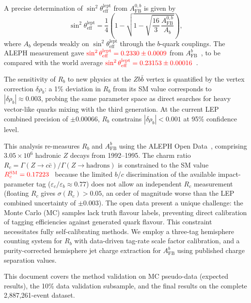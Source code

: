 \documentclass[11pt,a4paper]{article}
\newcommand{\external}[1]{\textcolor{red}{#1}}
\begin{document}
A precise determination of $\sin^2\theta_\text{eff}^\text{lept}$ from
$A_\text{FB}^{0,b}$ is given by
\begin{equation}
\sin^2\theta_\text{eff}^\text{lept} = \frac{1}{4}\left(1 -
\sqrt{1 - \sqrt{\frac{16}{3}\,\frac{A_\text{FB}^{0,b}}{A_b}}}\right),
\label{eq:sin2theta}
\end{equation}
where $A_b$ depends weakly on $\sin^2\theta_\text{eff}^\text{lept}$
through the $b$-quark couplings.
The ALEPH measurement gave
$\external{\sin^2\theta_\text{eff}^\text{lept} = 0.2330 \pm 0.0009}$
from $A_\text{FB}^b$~\cite{ALEPH:AFBb}, to be compared with the
world average
$\external{\sin^2\theta_\text{eff}^\text{lept} = 0.23153 \pm 0.00016}$~\cite{LEP:EWWG:2005}.

The sensitivity of $R_b$ to new physics at the $Zb\bar{b}$ vertex
is quantified by the vertex correction $\delta\rho_b$: a 1\%
deviation in $R_b$ from its SM value corresponds to
$|\delta\rho_b| \approx 0.003$, probing the same parameter space
as direct searches for heavy vector-like quarks mixing with the
third generation.
At the current LEP combined precision of $\pm 0.00066$, $R_b$
constrains $|\delta\rho_b| < 0.001$ at 95\% confidence level.

This analysis re-measures $R_b$ and $A_\text{FB}^b$ using the ALEPH
Open Data~\cite{ALEPH:opendata}, comprising $3.05 \times 10^6$ hadronic
$Z$ decays from 1992--1995.
The charm ratio $R_c = \Gamma(Z \to c\bar{c})/\Gamma(Z \to
\text{hadrons})$ is constrained to the SM value
$\external{R_c^\text{SM} = 0.17223}$~\cite{LEP:EWWG:2005}
because the limited $b$/$c$ discrimination of the available
impact-parameter tag ($\varepsilon_c/\varepsilon_b \approx 0.77$)
does not allow an independent $R_c$ measurement
(floating $R_c$ gives $\sigma(R_c) > 0.05$, an order of magnitude
worse than the LEP combined uncertainty of $\pm 0.003$).
The open data present a unique challenge: the Monte Carlo (MC) samples
lack truth flavour labels, preventing direct calibration of tagging
efficiencies against generated quark flavour.
This constraint necessitates fully self-calibrating methods.
We employ a three-tag hemisphere counting system for $R_b$ with
data-driven tag-rate scale factor calibration, and a purity-corrected
hemisphere jet charge extraction for $A_\text{FB}^b$ using published
charge separation values.

This document covers the method validation on MC pseudo-data
(expected results), the 10\% data validation subsample, and the
final results on the complete 2,887,261-event dataset.
\end{document}

